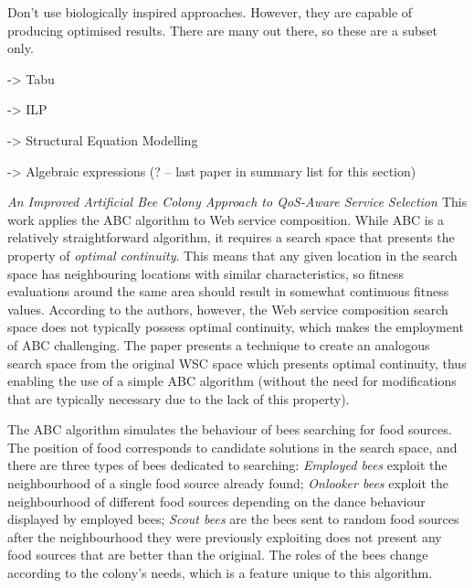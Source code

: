 Don't use biologically inspired approaches. However, they are capable of producing optimised results. There are many out there, so
these are a subset only.

-> Tabu

-> ILP

-> Structural Equation Modelling

-> Algebraic expressions (? -- last paper in summary list for this section)

\textit{An Improved Artificial Bee Colony Approach to QoS-Aware Service Selection \cite{wang2013improved}}
This work applies the ABC algorithm to Web service composition. While ABC is a relatively straightforward algorithm, it requires a search space
that presents the property of \textit{optimal continuity}. This means that any given location in the search space has neighbouring locations with
similar characteristics, so fitness evaluations around the same area should result in somewhat continuous fitness values. According to the authors,
however, the Web service composition search space does not typically possess optimal continuity, which makes the employment of ABC challenging.
The paper presents a technique to create an analogous search space from the original WSC space which presents optimal continuity, thus enabling the
use of a simple ABC algorithm (without the need for modifications that are typically necessary due to the lack of this property).

The ABC algorithm simulates the behaviour of bees searching for food sources. The position of food corresponds to candidate solutions in the
search space, and there are three types of bees dedicated to searching: \textit{Employed bees} exploit the neighbourhood of a single food
source already found; \textit{Onlooker bees} exploit the neighbourhood of different food sources depending on the dance behaviour displayed by
employed bees; \textit{Scout bees} are the bees sent to random food sources after the neighbourhood they were previously exploiting does not
present any food sources that are  better than the original. The roles of the bees change according to the colony's needs, which is a feature
unique to this algorithm.

